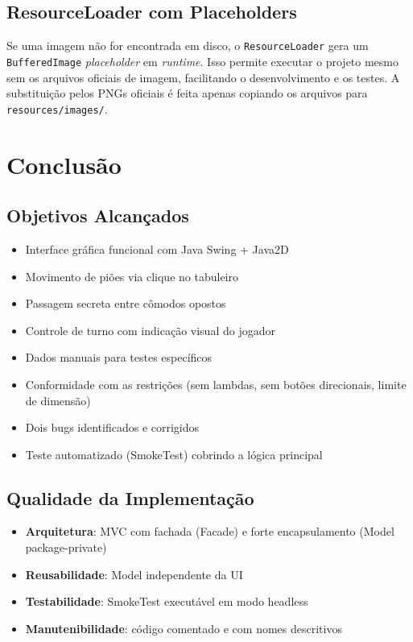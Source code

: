 \documentclass[12pt,a4paper]{report}
\begin{document}
\section{ResourceLoader com Placeholders}

Se uma imagem não for encontrada em disco, o \texttt{ResourceLoader} gera um \texttt{BufferedImage} \textit{placeholder} em \textit{runtime}. Isso permite executar o projeto mesmo sem os arquivos oficiais de imagem, facilitando o desenvolvimento e os testes. A substituição pelos PNGs oficiais é feita apenas copiando os arquivos para \texttt{resources/images/}.

\chapter{Conclusão}

\section{Objetivos Alcançados}

\begin{itemize}
    \item Interface gráfica funcional com Java Swing + Java2D
    \item Movimento de piões via clique no tabuleiro
    \item Passagem secreta entre cômodos opostos
    \item Controle de turno com indicação visual do jogador
    \item Dados manuais para testes específicos
    \item Conformidade com as restrições (sem lambdas, sem botões direcionais, limite de dimensão)
    \item Dois bugs identificados e corrigidos
    \item Teste automatizado (SmokeTest) cobrindo a lógica principal
\end{itemize}

\section{Qualidade da Implementação}

\begin{itemize}
    \item \textbf{Arquitetura}: MVC com fachada (Facade) e forte encapsulamento (Model package-private)
    \item \textbf{Reusabilidade}: Model independente da UI
    \item \textbf{Testabilidade}: SmokeTest executável em modo headless
    \item \textbf{Manutenibilidade}: código comentado e com nomes descritivos
\end{itemize}
\end{document}
